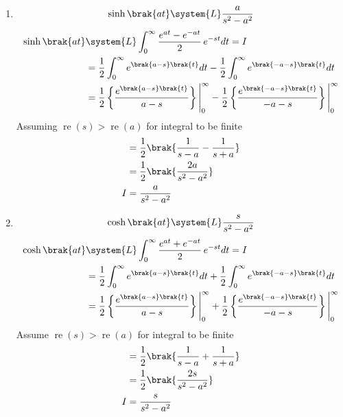 \begin{enumerate}[label=\thesubsection.\arabic*,ref=\thesubsection.\theenumi]
\begin{align}
                          I&=\frac{a}{a^2}-\frac{s^2}{a^2}\brak{I}\\
       \brak{\frac{a^2+s^2}{a^2}}I&=\frac{a}{a^2}\\
                          I&=\frac{a}{s^2+a^2}
\end{align}
\item
\begin{align}
\sinh\brak{at}\system{L}\frac{a}{s^2-a^2}\label{eq:laplacesinh}
\end{align}
\solution
\begin{align}
\sinh\brak{at}&\system{L}\int_0^\infty \frac{e^{at}-e^{-at}}{2}\,e^{-st} dt=I\\
                            &=\frac{1}{2}\int_0^\infty e^{\brak{a-s}\brak{t}} dt -\frac{1}{2}\int_0^\infty e^{\brak{-a-s}\brak{t}}dt\\
                            &=\frac{1}{2}\left\{\frac{e^{\brak{a-s}\brak{t}}}{a-s}\right\}\Bigg|_0^\infty-\frac{1}{2}\left\{\frac{e^{\brak{-a-s}\brak{t}}}{-a-s}\right\}\Bigg|_0^\infty
                            \end{align}
                            Assuming $\operatorname{re}(s)>\operatorname{re}(a)$ for integral to be finite
                            \begin{align}
                            &=\frac{1}{2}\brak{\frac{1}{s-a}-\frac{1}{s+a}}\\
                            &=\frac{1}{2}\brak{\frac{2a}{s^2-a^2}}\\
                           I&=\frac{a}{s^2-a^2}
\end{align}
\item
\begin{align}
\cosh\brak{at}\system{L}\frac{s}{s^2-a^2}\label{eq:laplacecosh}
\end{align}
\solution
\begin{align}
\cosh\brak{at}&\system{L}\int_0^\infty \frac{e^{at}+e^{-at}}{2}\,e^{-st} dt=I\\
                            &=\frac{1}{2}\int_0^\infty e^{\brak{a-s}\brak{t}} dt +\frac{1}{2}\int_0^\infty e^{\brak{-a-s}\brak{t}}dt\\
                            &=\frac{1}{2}\left\{\frac{e^{\brak{a-s}\brak{t}}}{a-s}\right\}\Bigg|_0^\infty+\frac{1}{2}\left\{\frac{e^{\brak{-a-s}\brak{t}}}{-a-s}\right\}\Bigg|_0^\infty
                            \end{align}
                            Assume $\operatorname{re}(s)>\operatorname{re}(a)$ for integral to be finite
                            \begin{align}
                            &=\frac{1}{2}\brak{\frac{1}{s-a}+\frac{1}{s+a}}\\
                            &=\frac{1}{2}\brak{\frac{2s}{s^2-a^2}}\\
                           I&=\frac{s}{s^2-a^2}
\end{align}


\end{enumerate}
